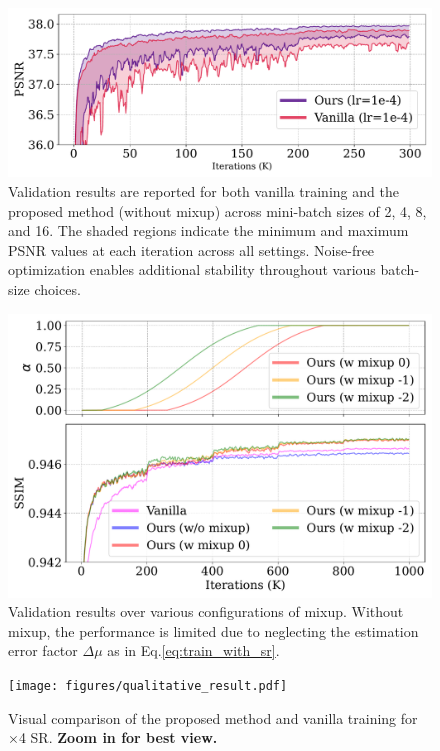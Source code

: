 \documentclass[letterpaper]{article} %
\begin{document}
\begin{figure}[h]
    \includegraphics[width=\columnwidth]{figures/different_batch_size.pdf}
    \caption{
    Validation results are reported for both vanilla training and the proposed method (without mixup) across mini-batch sizes of 2, 4, 8, and 16. The shaded regions indicate the minimum and maximum PSNR values at each iteration across all settings. Noise-free optimization enables additional stability throughout various batch-size choices.
    }
    \label{fig:different_batch_size}
\end{figure}

%

\begin{figure}[h]
    \includegraphics[width=\columnwidth]{figures/longer_training.pdf}
    \caption{
    Validation results over various configurations of mixup. Without mixup, the performance is limited due to neglecting the estimation error factor $\Delta\mu$ as in Eq.\eqref{eq:train_with_sr}. 
    }
    \label{fig:longer_training}
\end{figure}



\begin{figure}[t]
    \texttt{[image: figures/qualitative\_result.pdf]}
    \caption{
    Visual comparison of the proposed method and vanilla training for $\times$4 SR. \textbf{Zoom in for best view.}
    }
    \label{fig:qualitative_result}
\end{figure}
\end{document}
